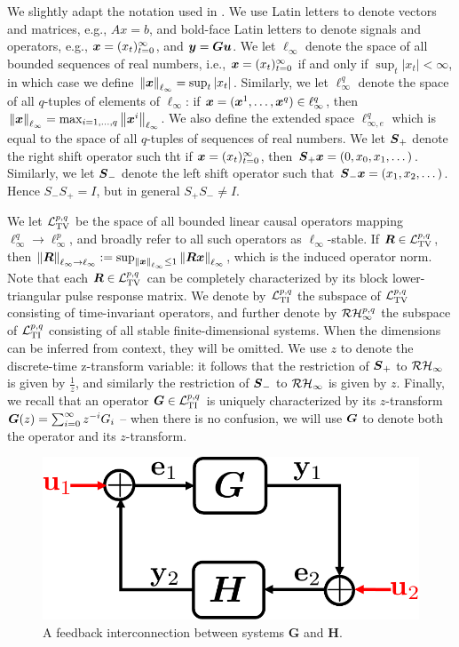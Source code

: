 We slightly adapt the notation used in \cite{khammash1990stability}.  We use Latin letters to denote vectors and matrices, e.g., $Ax = b$, and bold-face Latin letters to denote signals and operators, e.g., $\boldsymbol{x} = (x_t)_{t=0}^\infty$, and $\boldsymbol{y} = \boldsymbol{G} \boldsymbol{u}$.  We let $\ell_\infty$ denote the space of all bounded sequences of real numbers, i.e., $\boldsymbol{x} = (x_t)_{t=0}^\infty$ if and only if $\sup_t |x_t|<\infty$, in which case we define $\left\|\boldsymbol{x}\right\|_{\ell_\infty} = \sup_t |x_t|$.  Similarly, we let $\ell^q_\infty$ denote the space of all $q$-tuples of elements of $\ell_\infty$: if $\boldsymbol{x} = (\boldsymbol{x}^1, \dots, \boldsymbol{x}^q) \in \ell^q_\infty$, then $\left\|\boldsymbol{x}\right\|_{\ell_\infty} = \max_{i=1,\dots, q}\left\|\boldsymbol{x}^i\right\|_{\ell_\infty}$.  We also define the extended space $\ell^{q}_{\infty,e}$ which is equal to the space of all $q$-tuples of sequences of real numbers.  We let $\boldsymbol{S}_+$ denote the right shift operator such tht if $\boldsymbol{x} = (x_t)_{t=0}^\infty$, then $\boldsymbol{S}_+\boldsymbol{x} = (0,x_0, x_1, \dots)$.  Similarly, we let $\boldsymbol{S}_-$ denote the left shift operator such that $\boldsymbol{S}_- \boldsymbol{x} = (x_1,x_2, \dots)$.  Hence $S_-S_+ = I$, but in general $S_+ S_- \neq I$.  

We let $\mathcal{L}_{\mathrm{TV}}^{p,q}$ be the space of all bounded linear causal operators mapping $\ell^q_\infty \to \ell^p_\infty$, and broadly refer to all such operators as $\ell_\infty$-stable.  If $\boldsymbol{R} \in \mathcal{L}_{\mathrm{TV}}^{p,q}$, then $\left\|\boldsymbol{R}\right\|_{\ell_\infty\to\ell_\infty} := \sup_{\left\|\boldsymbol{x}\right\|_{\ell_\infty}\leq 1}\left\|\boldsymbol{R} \boldsymbol{x}\right\|_{\ell_\infty}$, which is the induced operator norm.  Note that each $\boldsymbol{R} \in \mathcal{L}_{\mathrm{TV}}^{p,q}$ can be completely characterized by its block lower-triangular pulse response matrix.  We denote by $\mathcal{L}_{\mathrm{TI}}^{p,q}$ the subspace of $\mathcal{L}_{\mathrm{TV}}^{p,q}$ consisting of time-invariant operators, and further denote by $\mathcal{RH}_\infty^{p,q}$ the subspace of $\mathcal{L}_{\mathrm{TI}}^{p,q}$ consisting of all stable finite-dimensional systems.  When the dimensions can be inferred from context, they will be omitted.  We use $z$ to denote the discrete-time z-transform variable: it follows that the restriction of $\boldsymbol{S}_+$ to $\mathcal{RH}_\infty$ is given by $\frac{1}{z}$, and similarly the restriction of $\boldsymbol{S}_-$ to $\mathcal{RH}_\infty$ is given by $z$.  Finally, we recall that an operator $\boldsymbol{G} \in \mathcal{L}_{\mathrm{TI}}^{p,q}$ is uniquely characterized by its $z$-transform $\boldsymbol{G}(z) = \sum_{i=0}^\infty z^{-i}G_i$ -- when there is no confusion, we will use $\boldsymbol{G}$ to denote both the operator and its $z$-transform.

\begin{figure}
\centering
\includegraphics[width=.4\columnwidth]{well-posed}
\caption{A feedback interconnection between systems $\mathbf{G}$ and $\mathbf{H}$.}
\label{fig:well-posed}
\end{figure}


